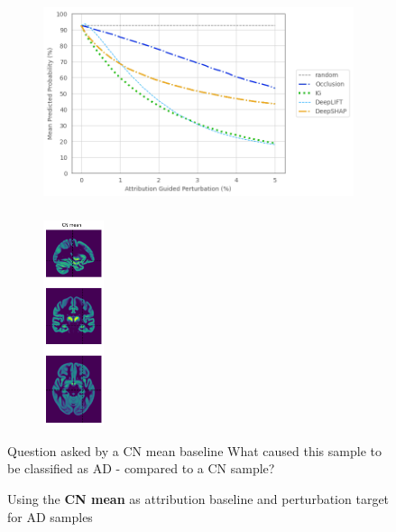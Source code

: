\documentclass[aspectratio=169,xcolor={table, dvipsnames}]{beamer}
\renewcommand{\emph}[1]{\textbf{#1}}
\begin{document}
\begin{frame}[plain]
	\begin{figure}
		\begin{subfigure}{0.8\textwidth}
			\centering
			\includegraphics[height=6cm]{figures/3672-ad-fidelity-cn2.png}
		\end{subfigure}\hfill
		\begin{subfigure}{0.2\textwidth}
			\centering
			\includegraphics[height=6cm]{figures/cn_mean.png}
		\end{subfigure}
		\caption*{Using the \emph{CN mean} as attribution baseline and perturbation target for AD samples}
		\begin{block}{Question asked by a CN mean baseline}
			What caused this sample to be classified as AD - compared to a CN sample?
		\end{block}
	\end{figure}
\end{frame}

% 
\end{document}
